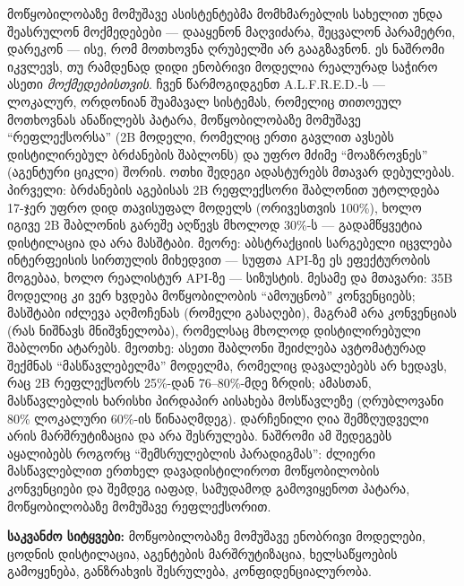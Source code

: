 \begingroup\georgianfont
მოწყობილობაზე მომუშავე ასისტენტებმა მომხმარებლის სახელით უნდა შეასრულონ
მოქმედებები --- დააყენონ მაღვიძარა, შეცვალონ პარამეტრი, დარეკონ --- ისე, რომ
მოთხოვნა ღრუბელში არ გააგზავნონ. ეს ნაშრომი იკვლევს, თუ რამდენად დიდი ენობრივი
მოდელია რეალურად საჭირო ასეთი \emph{მოქმედებისთვის}. ჩვენ წარმოგიდგენთ
A.L.F.R.E.D.-ს --- ლოკალურ, ორდონიან შუამავალ სისტემას, რომელიც თითოეულ
მოთხოვნას ანაწილებს პატარა, მოწყობილობაზე მომუშავე ``რეფლექსორსა'' (2B მოდელი,
რომელიც ერთი გავლით ავსებს დისტილირებულ ბრძანების შაბლონს) და უფრო მძიმე
``მოაზროვნეს'' (აგენტური ციკლი) შორის. ოთხი შედეგი ადასტურებს მთავარ დებულებას.
პირველი: ბრძანების აგებისას 2B რეფლექსორი შაბლონით უტოლდება 17-ჯერ უფრო დიდ
თავისუფალ მოდელს (ორივესთვის 100\%), ხოლო იგივე 2B შაბლონის გარეშე აღწევს მხოლოდ
30\%-ს --- გადამწყვეტია დისტილაცია და არა მასშტაბი. მეორე: აბსტრაქციის სარგებელი
იცვლება ინტერფეისის სირთულის მიხედვით --- სუფთა API-ზე ეს ეფექტურობის მოგებაა,
ხოლო რეალისტურ API-ზე --- სიზუსტის. მესამე და მთავარი: 35B მოდელიც კი ვერ ხვდება
მოწყობილობის ``ამოუცნობ'' კონვენციებს; მასშტაბი იძლევა აღმოჩენას (რომელი გასაღები),
მაგრამ არა კონვენციას (რას ნიშნავს მნიშვნელობა), რომელსაც მხოლოდ დისტილირებული
შაბლონი ატარებს. მეოთხე: ასეთი შაბლონი შეიძლება ავტომატურად შექმნას ``მასწავლებელმა''
მოდელმა, რომელიც დავალებებს არ ხედავს, რაც 2B რეფლექსორს 25\%-დან 76--80\%-მდე
ზრდის; ამასთან, მასწავლებლის ხარისხი პირდაპირ აისახება მოსწავლეზე (ღრუბლოვანი 80\%
ლოკალური 60\%-ის წინააღმდეგ). დარჩენილი ღია შემზღუდველი არის მარშრუტიზაცია და არა
შესრულება. ნაშრომი ამ შედეგებს აყალიბებს როგორც ``შემსრულებლის პარადიგმას'': ძლიერი
მასწავლებლით ერთხელ დავადისტილიროთ მოწყობილობის კონვენციები და შემდეგ იაფად,
სამუდამოდ გამოვიყენოთ პატარა, მოწყობილობაზე მომუშავე რეფლექსორით.

\vspace{0.6em}
\noindent\textbf{საკვანძო სიტყვები:} მოწყობილობაზე მომუშავე ენობრივი მოდელები,
ცოდნის დისტილაცია, აგენტების მარშრუტიზაცია, ხელსაწყოების გამოყენება, განზრახვის
შესრულება, კონფიდენციალურობა.
\endgroup
